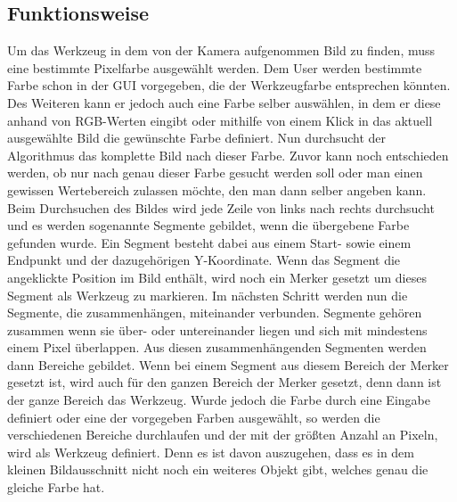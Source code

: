 \documentclass[12pt,a4paper,bibliography=totocnumbered,listof=totocnumbered]{scrartcl}
\begin{document}
\subsection{Funktionsweise}
Um das Werkzeug in dem von der Kamera aufgenommen Bild zu finden, muss eine bestimmte Pixelfarbe ausgewählt werden.  Dem User werden bestimmte Farbe schon in der GUI vorgegeben, die der Werkzeugfarbe entsprechen könnten. Des Weiteren kann er jedoch auch eine Farbe selber auswählen, in dem er diese anhand von RGB-Werten eingibt oder mithilfe von einem Klick in das aktuell ausgewählte Bild die gewünschte Farbe definiert. Nun durchsucht der Algorithmus das komplette Bild nach dieser Farbe. Zuvor kann noch entschieden werden, ob nur nach genau dieser Farbe gesucht werden soll oder man einen gewissen Wertebereich zulassen möchte, den man dann selber angeben kann. Beim Durchsuchen des Bildes wird jede Zeile von links nach rechts durchsucht und es werden sogenannte Segmente gebildet, wenn die übergebene Farbe gefunden wurde. Ein Segment besteht dabei aus einem Start- sowie einem Endpunkt und der dazugehörigen Y-Koordinate. Wenn das Segment die angeklickte Position im Bild enthält, wird noch ein Merker gesetzt um dieses Segment als Werkzeug zu markieren. Im nächsten Schritt werden nun die Segmente, die zusammenhängen, miteinander verbunden. Segmente gehören zusammen wenn sie über- oder untereinander liegen und sich mit mindestens einem Pixel überlappen. Aus diesen zusammenhängenden Segmenten werden dann Bereiche gebildet. Wenn bei einem Segment aus diesem Bereich der Merker gesetzt ist, wird auch für den ganzen Bereich der Merker gesetzt, denn dann ist der ganze Bereich das Werkzeug. Wurde jedoch die Farbe durch eine Eingabe definiert oder eine der vorgegeben Farben ausgewählt, so werden die verschiedenen Bereiche durchlaufen und der mit der größten Anzahl an Pixeln, wird als Werkzeug definiert. Denn es ist davon auszugehen, dass es in dem kleinen Bildausschnitt nicht noch ein weiteres Objekt gibt, welches genau die gleiche Farbe hat.
\end{document}
